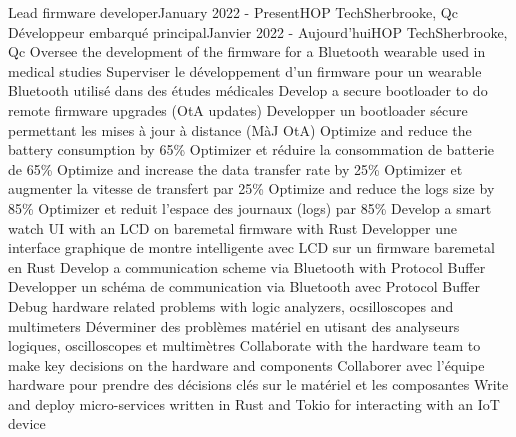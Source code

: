   \resumeSubHeadingListStart
      \resumeSubheadingEnFr
        {Lead firmware developer}{January 2022 - Present}{HOP Tech}{Sherbrooke, Qc}
        {Développeur embarqué principal}{Janvier 2022 - Aujourd'hui}{HOP Tech}{Sherbrooke, Qc}
            \resumeItemListStart
                \resumeItemEnFr
                    {Oversee the development of the firmware for a Bluetooth wearable used in medical studies}
                    {Superviser le développement d'un firmware pour un wearable Bluetooth utilisé dans des études médicales}
                \resumeItemEnFr
                    {Develop a secure bootloader to do remote firmware upgrades (OtA updates)}
                    {Developper un bootloader sécure permettant les mises à jour à distance (MàJ OtA)}
                \resumeItemEnFr
                    {Optimize and reduce the battery consumption by 65\%}
                    {Optimizer et réduire la consommation de batterie de 65\%}
                \resumeItemEnFr
                    {Optimize and increase the data transfer rate by 25\%}
                    {Optimizer et augmenter la vitesse de transfert par 25\%}
                \resumeItemEnFr
                    {Optimize and reduce the logs size by 85\%}
                    {Optimizer et reduit l'espace des journaux (logs) par 85\%}  
                \resumeItemEnFr
                    {Develop a smart watch UI with an LCD on baremetal firmware with Rust}
                    {Developper une interface graphique de montre intelligente avec LCD sur un firmware baremetal en Rust}
                \resumeItemEnFr
                    {Develop a communication scheme via Bluetooth with Protocol Buffer}
                    {Developper un schéma de communication via Bluetooth avec Protocol Buffer}
                \resumeItemEnFr
                    {Debug hardware related problems with logic analyzers, ocsilloscopes and multimeters}
                    {Déverminer des problèmes matériel en utisant des analyseurs logiques, oscilloscopes et multimètres}
                \resumeItemEnFr
                    {Collaborate with the hardware team to make key decisions on the hardware and components}
                    {Collaborer avec l'équipe hardware pour prendre des décisions clés sur le matériel et les composantes}
                \resumeItemEnFr
                    {Write and deploy micro-services written in Rust and Tokio for interacting with an IoT device}
